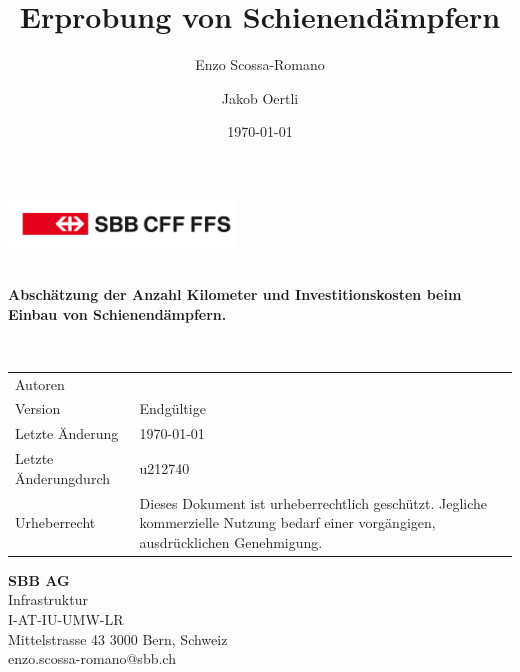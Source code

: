 \usepackage{alltt}
\usepackage[ngerman, english, french]{babel}
   \usepackage[T1]{fontenc}
\usepackage{mathpple}
\usepackage{helvet}
% 
\usepackage{amsmath,amsfonts,amssymb}
\usepackage{graphicx, rotating,xcolor,placeins,tabularx,booktabs,caption}
\usepackage{tikz}\usepackage{tikz-qtree}\usepackage{xcolor}\usetikzlibrary{decorations.pathreplacing}
\usepackage{pdflscape,geometry,scrpage2,titling}
\usepackage{translator}
%
\usepackage{siunitx}
\DeclareSIUnit[number-unit-product = \;]
\DeclareSIPrefix{}
\usepackage[ citestyle=verbose-trad1,backend=biber]{biblatex}

\author{Enzo Scossa-Romano \and Jakob Oertli}
\date{\today}
\title{Erprobung von Schienendämpfern}

\begin{titlepage}
	\sffamily
	\begin{flushright}
	\includegraphics[width=60mm]{logo.pdf}
	\end{flushright}
	\vspace{10\baselineskip}
	\parbox{165mm}{{\noindent\Huge\bfseries \thetitle}\\[1\baselineskip]
	\noindent\Large\bfseries Abschätzung der Anzahl Kilometer und Investitionskosten beim Einbau von  Schienendämpfern.}
	\\[8\baselineskip]
	{\footnotesize
	\begin{tabularx}{150mm}{@{}l X}
		Autoren 		& \theauthor \\
		Version 		& Endgültige\\
		Letzte Änderung	& \today\\
		Letzte Änderungdurch& u212740\\
		Urheberrecht 	& Dieses Dokument ist urheberrechtlich geschützt. Jegliche kommerzielle Nutzung bedarf einer vorgängigen, ausdrücklichen Genehmigung.\\
	\end{tabularx}
	}
	\vfill 
	\parbox{100mm}{\small
	\textbf{SBB AG}\\
	Infrastruktur \\ 
	I-AT-IU-UMW-LR\\
	Mittelstrasse 43 3000 Bern, Schweiz\\
	enzo.scossa-romano@sbb.ch}
\end{titlepage}
\restoregeometry
\cleardoubleemptypage
\pagestyle{empty}

